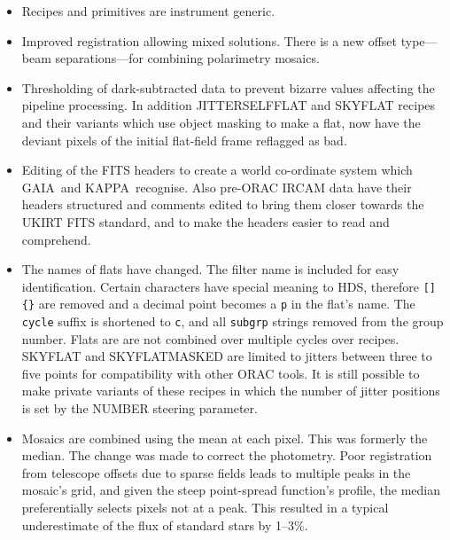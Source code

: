 \documentclass[twoside,11pt]{article}
\newcommand{\htmladdnormallink}[2]{#1}
\newcommand{\htmlref}[2]{#1}
\renewcommand{\_}{\texttt{\symbol{95}}}
\newcommand{\GAIA}{{\footnotesize GAIA}}
\newcommand{\KAPPA}{{\footnotesize KAPPA}}
\begin{document}
\begin{itemize}
   \item Recipes and primitives are instrument generic.
   \item \htmlref{Improved registration}{automatic_registration} allowing
      mixed solutions.  There is a new offset type---beam
      separa\-tions---for combining polarimetry mosaics.
   \item \htmlref{Thresholding}{bad_pixels} of dark-subtracted data
      to prevent bizarre values affecting the pipeline processing.
      In addition \htmlref{JITTER\_SELF\_FLAT}{JITTER\_SELF\_FLAT} and
      \htmlref{SKY\_FLAT}{SKY\_FLAT} recipes and their variants which
      use object masking to make a flat, now have the deviant pixels of
      the initial flat-field frame reflagged as bad.
   \item Editing of the FITS headers to create a world co-ordinate
      system which \GAIA\ and \KAPPA\ recognise.  Also pre-ORAC IRCAM
      data have their headers structured and comments edited to bring
      them closer towards the \htmladdnormallink{UKIRT FITS
      standard}{http://www.jach.hawaii.edu/JACpublic/UKIRT/software/orac/docs/orac016-fith.fm.A4.ps},
      and to make the headers easier to read and comprehend.
   \item The names of flats have changed.  The filter name is included
      for easy identification.  Certain characters have special
      meaning to HDS, therefore {\tt []\{\}} are removed and a decimal
      point becomes a {\tt p} in the flat's name.  The {\tt{\_cycle}}
      suffix is shortened to {\tt{\_c}}, and all {\tt{\_subgrp}}
      strings removed from the group number.  Flats are are not
      combined over multiple cycles over recipes.  SKY\_FLAT and
      SKY\_FLAT\_MASKED are limited to jitters between three to five
      points for compatibility with other ORAC tools.  It is still
      possible to make private variants of these recipes in which the
      number of jitter positions is set by the NUMBER steering
      parameter.
   \item Mosaics are combined using the mean at each pixel.  This was
      formerly the median.  The change was made to correct the
      photometry.  Poor registration from telescope offsets due to
      sparse fields leads to multiple peaks in the mosaic's grid, and
      given the steep point-spread function's profile, the median
      preferentially selects pixels not at a peak.  This resulted in a
      typical underestimate of the flux of standard stars by 1--3\%.

\end{itemize}
\end{document}
